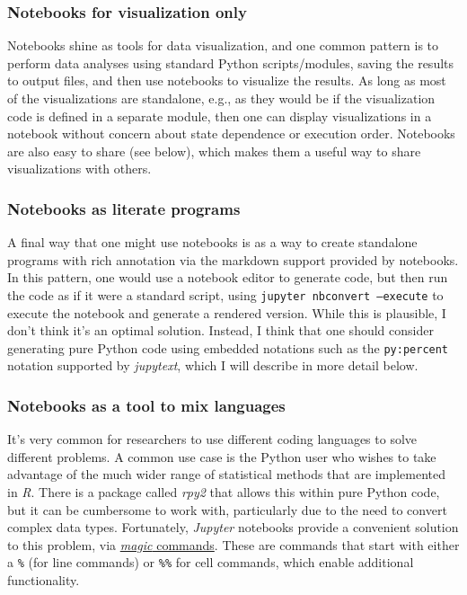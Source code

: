 \subsubsection{Notebooks for visualization only}

Notebooks shine as tools for data visualization, and one common pattern is to perform data analyses using standard Python scripts/modules, saving the results to output files, and then use notebooks to visualize the results.  As long as most of the visualizations are standalone, e.g., as they would be if the visualization code is defined in a separate module, then one can display visualizations in a notebook without concern about state dependence or execution order.  Notebooks are also easy to share (see below), which makes them a useful way to share visualizations with others.

\subsubsection{Notebooks as literate programs}

A final way that one might use notebooks is as a way to create standalone programs with rich annotation via the markdown support provided by notebooks.  In this pattern, one would use a notebook editor to generate code, but then run the code as if it were a standard script, using \texttt{jupyter nbconvert --execute} to execute the notebook and generate a rendered version.  While this is plausible, I don't think it's an optimal solution.  Instead, I think that one should consider generating pure Python code using embedded notations such as the \texttt{py:percent} notation supported by \textit{jupytext}, which I will describe in more detail below.

\subsubsection{Notebooks as a tool to mix languages}

It's very common for researchers to use different coding languages to solve different problems.  A common use case is the Python user who wishes to take advantage of the much wider range of statistical methods that are implemented in \textit{R}.  There is a package called \textit{rpy2} that allows this within pure Python code, but it can be cumbersome to work with, particularly due to the need to convert complex data types.  Fortunately, \textit{Jupyter} notebooks provide a convenient solution to this problem, via \href{https://scipy-ipython.readthedocs.io/en/latest/interactive/magics.html}{\textit{magic} commands}.  These are commands that start with either a \texttt{\%} (for line commands) or \texttt{\%\%} for cell commands, which enable additional functionality.

